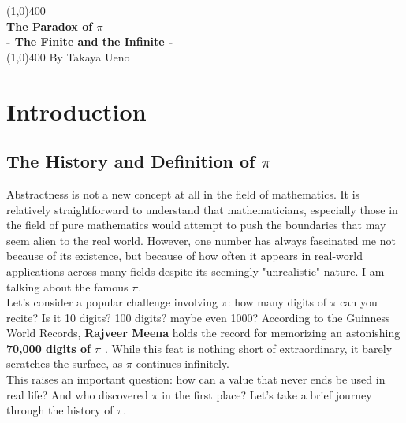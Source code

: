 \documentclass[12pt]{article}
\begin{document}
\begin{titlepage}
\begin{center}
\vspace*{1cm}
\vfill
\line(1,0){400}\\[1mm]
\huge{\textbf{The Paradox of $\pi$}}\\[3mm]
\Large{\textbf{- The Finite and the Infinite -}}\\[1mm]
\line(1,0){400}
\vfill
By Takaya Ueno
\end{center}
\end{titlepage}

\section{Introduction}

\subsection{The History and Definition of $\pi$}
Abstractness is not a new concept at all in the field of mathematics. It is relatively straightforward to understand that mathematicians, especially those in the field of pure mathematics would attempt to push the boundaries that may seem alien to the real world. However, one number has always fascinated me \textendash not because of its existence, but because of how often it appears in real-world applications across many fields despite its seemingly "unrealistic" nature. I am talking about the famous $\pi$.\\

\noindent Let's consider a popular challenge involving $\pi$: how many digits of $\pi$ can you recite? Is it 10 digits? 100 digits? maybe even 1000? According to the Guinness World Records, \textbf{Rajveer Meena} holds the record for memorizing an astonishing \textbf{70,000 digits of $\pi$} \cite{guinness2017}. While this feat is nothing short of extraordinary, it barely scratches the surface, as $\pi$ continues infinitely.\\

\noindent This raises an important question: how can a value that never ends be used in real life? And who discovered $\pi$ in the first place? Let's take a brief journey through the history of $\pi$. \\
\end{document}
